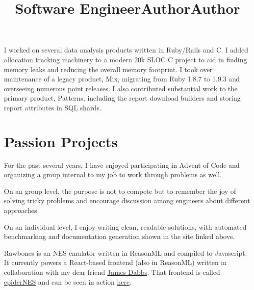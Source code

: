 \documentclass[margintitle,line]{res}
\renewcommand{\subsection}[1]{\section{\normalfont #1}}
\begin{document}
\begin{resume}
\title{Software Engineer}
\begin{position}
  I worked on several data analysis products written in Ruby/Rails and C.
  I added allocation tracking machinery to a modern 20k SLOC C project to aid
  in finding memory leaks and reducing the overall memory footprint. I took
  over maintenance of a legacy product, Mix, migrating from Ruby 1.8.7 to 1.9.3
  and overseeing numerous point releases. I also contributed substantial work
  to the primary product, Patterns, including the report download builders and
  storing report attributes in SQL shards.
\end{position}


\pagebreak

\setlength{\parskip}{1ex}


\subsection{Passion Projects}

\title{Author}
\begin{position}
  For the past several years, I have enjoyed participating in Advent of Code and
  organizing a group internal to my job to work through problems as well.

  On an group level, the purpose is not to compete but to remember the joy of solving
  tricky problems and encourage discussion among engineers about different approaches.

  On an individual level, I enjoy writing clean, readable solutions, with automated
  benchmarking and documentation generation shown in the site linked above.
\end{position}

\title{Author}
\begin{position}
  Rawbones is an NES emulator written in ReasonML and compiled to Javascript. It
  currently powers a React-based frontend (also in ReasonML) written in collaboration
  with my dear friend \href{https://jdabbs.com}{James Dabbs}. That frontend is called
  \href{https://github.com/jamesdabbs/epiderNES}{epiderNES} and can be seen in action
  \href{https://kingcons.io/epiderNES/}{here}.


\end{position}
\end{resume}
\end{document}
